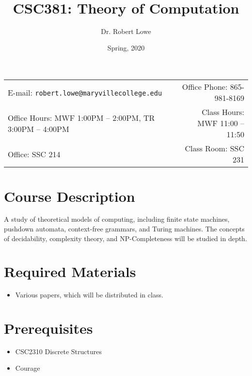 \documentclass[11pt]{article}
\title{CSC381: Theory of Computation}
\author{Dr. Robert Lowe}
\date{Spring, 2020}
\newcommand{\blankline}{\quad\pagebreak[2]}
\begin{document}
\maketitle

\blankline

\begin{tabular*}{.93\textwidth}{@{\extracolsep{\fill}}lr}

E-mail: \texttt{robert.lowe@maryvillecollege.edu} & Office Phone: 865-981-8169 \\

 Office Hours: MWF 1:00PM -- 2:00PM, TR 3:00PM -- 4:00PM  &  Class
 Hours: MWF 11:00 -- 11:50\\
 Office: SSC 214 & Class Room: SSC 231\\
\hline
\end{tabular*}

\vspace{5 mm}

\section*{Course Description}
A study of theoretical models of computing, including finite state
machines, pushdown automata, context-free grammars, and Turing
machines. The concepts of decidability, complexity theory, and
NP-Completeness will be studied in depth. 


\section*{Required Materials}
\begin{itemize}
    \item Various papers, which will be distributed in class.
\end{itemize}

\section*{Prerequisites}
\begin{itemize}
    \item CSC2310 Discrete Structures
    \item Courage
\end{itemize}
\end{document}
